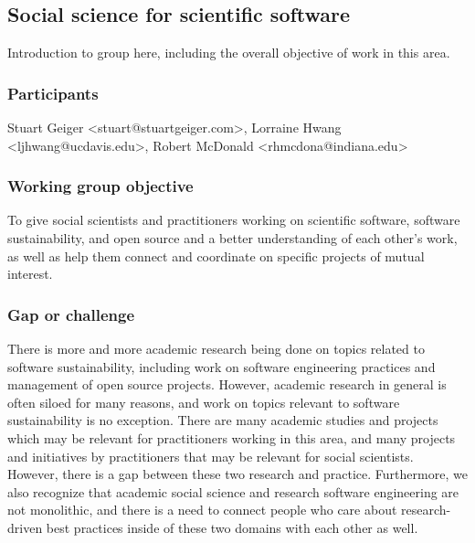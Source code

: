 \subsection{Social science for scientific software}
\label{sec:social}


Introduction to group here, including the overall objective of work in this area. \todo{}

\subsubsection{Participants}

Stuart Geiger <stuart@stuartgeiger.com>, Lorraine Hwang <ljhwang@ucdavis.edu>, Robert McDonald <rhmcdona@indiana.edu>

\subsubsection{Working group objective}

To give social scientists and practitioners working on scientific software, software sustainability, and open source and a better understanding of each other's work, as well as help them connect and coordinate on specific projects of mutual interest.

\subsubsection{Gap or challenge}

There is more and more academic research being done on topics related to software sustainability, including work on software engineering practices and management of open source projects. However, academic research in general is often siloed for many reasons, and work on topics relevant to software sustainability is no exception. There are many academic studies and projects which may be relevant for practitioners working in this area, and many projects and initiatives by practitioners that may be relevant for social scientists. However, there is a gap between these two research and practice. Furthermore, we also recognize that academic social science and research software engineering are not monolithic, and there is a need to connect people who care about research-driven best practices inside of these two domains with each other as well.

